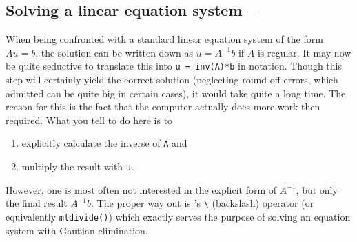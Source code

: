 
% 
% 


\subsection{Solving a linear equation system -- \cleansymbol\cleansymbol\fastsymbol\fastsymbol\fastsymbol}
When being confronted with a standard linear equation system of the form $Au=b$, the solution can be written down as $u = A^{-1}b$ if $A$ is regular. It may now be quite seductive to translate this into \lstinline!u = inv(A)*b! in \matlab{} notation. Though this step will certainly yield the correct solution (neglecting round-off errors, which admitted can be quite big in certain cases), it would take quite a long time. The reason for this is the fact that the computer actually does more work then required. What you tell \matlab{} to do here is to
\begin{enumerate}
\item explicitly calculate the inverse of \lstinline!A! and
\item multiply the result with \lstinline!u!.
\end{enumerate}
However, one is most often not interested in the explicit form of $A^{-1}$, but only the final result $A^{-1}b$. The proper way out is \matlab{}'s \lstinline!\! (backslash) operator (or equivalently \lstinline!mldivide()!) which exactly serves the purpose of solving an equation system with Gau{\ss}ian elimination.


